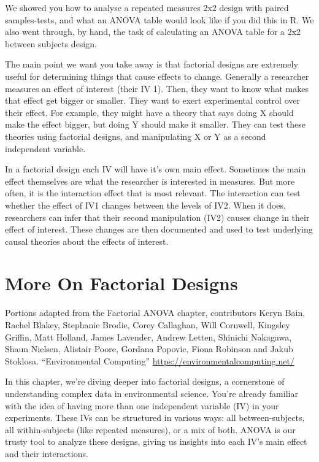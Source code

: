 \documentclass[
  letterpaper,
  DIV=11,
  numbers=noendperiod]{scrreprt}
\begin{document}
We showed you how to analyse a repeated measures 2x2 design with paired
samples-tests, and what an ANOVA table would look like if you did this
in R. We also went through, by hand, the task of calculating an ANOVA
table for a 2x2 between subjects design.

The main point we want you take away is that factorial designs are
extremely useful for determining things that cause effects to change.
Generally a researcher measures an effect of interest (their IV 1).
Then, they want to know what makes that effect get bigger or smaller.
They want to exert experimental control over their effect. For example,
they might have a theory that says doing X should make the effect
bigger, but doing Y should make it smaller. They can test these theories
using factorial designs, and manipulating X or Y as a second independent
variable.

In a factorial design each IV will have it's own main effect. Sometimes
the main effect themselves are what the researcher is interested in
measures. But more often, it is the interaction effect that is most
relevant. The interaction can test whether the effect of IV1 changes
between the levels of IV2. When it does, researchers can infer that
their second manipulation (IV2) causes change in their effect of
interest. These changes are then documented and used to test underlying
causal theories about the effects of interest.


\chapter{More On Factorial Designs}\label{more-on-factorial-designs}

Portions adapted from the Factorial ANOVA chapter, contributors Keryn
Bain, Rachel Blakey, Stephanie Brodie, Corey Callaghan, Will Cornwell,
Kingsley Griffin, Matt Holland, James Lavender, Andrew Letten, Shinichi
Nakagawa, Shaun Nielsen, Alistair Poore, Gordana Popovic, Fiona Robinson
and Jakub Stoklosa. ``Environmental Computing''
\url{https://environmentalcomputing.net/}

\hfill\break

In this chapter, we're diving deeper into factorial designs, a
cornerstone of understanding complex data in environmental science.
You're already familiar with the idea of having more than one
independent variable (IV) in your experiments. These IVs can be
structured in various ways: all between-subjects, all within-subjects
(like repeated measures), or a mix of both. ANOVA is our trusty tool to
analyze these designs, giving us insights into each IV's main effect and
their interactions.
\end{document}
